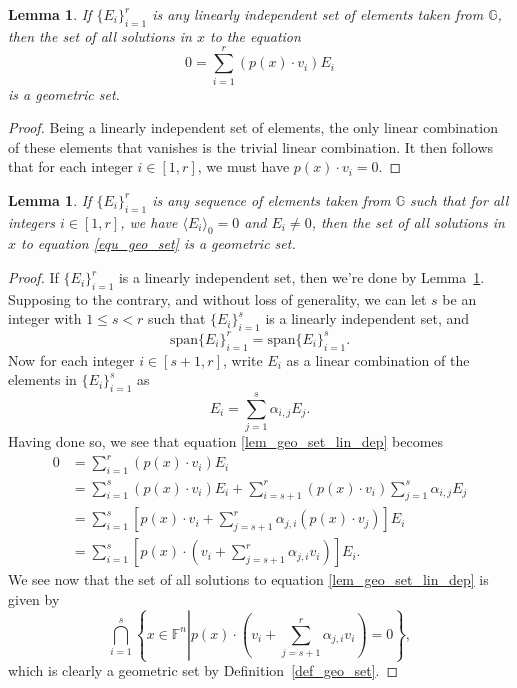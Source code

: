 \documentclass{birkjour}
\newtheorem{lem}[thm]{Lemma}
\theoremstyle{definition}
\theoremstyle{remark}
\numberwithin{equation}{section}
\newcommand{\F}{\mathbb{F}}
\newcommand{\G}{\mathbb{G}}
\begin{document}
\begin{lem}\label{lem_geo_set_lin_indep}
If $\{E_i\}_{i=1}^r$ is any linearly independent set of elements taken from $\G$, then the set of all
solutions in $x$ to the equation
\begin{equation}\label{equ_geo_set}
0 = \sum_{i=1}^r (p(x)\cdot v_i)E_i
\end{equation}
is a geometric set.
\end{lem}
\begin{proof}
Being a linearly independent set of elements, the only linear combination of these elements that vanishes is the trivial linear combination.
It then follows that for each integer $i\in[1,r]$, we must have $p(x)\cdot v_i=0$.
\end{proof}

\begin{lem}\label{lem_geo_set_lin_dep}
If $\{E_i\}_{i=1}^r$ is any sequence of elements taken from $\G$ such that for all integers $i\in[1,r]$, we have
$\langle E_i\rangle_0=0$ and $E_i\neq 0$, then the set of all solutions in $x$ to equation \eqref{equ_geo_set}
is a geometric set.
\end{lem}
\begin{proof}
If $\{E_i\}_{i=1}^r$ is a linearly independent set, then we're done by Lemma~\ref{lem_geo_set_lin_indep}.
Supposing to the contrary, and without loss of generality, we can let $s$ be an integer with $1\leq s<r$ such that
$\{E_i\}_{i=1}^s$ is a linearly independent set, and
\begin{equation*}
\mbox{span}\{E_i\}_{i=1}^r = \mbox{span}\{E_i\}_{i=1}^s.
\end{equation*}
Now for each integer $i\in[s+1,r]$, write $E_i$ as a linear combination of the elements in $\{E_i\}_{i=1}^s$ as
\begin{equation*}
E_i = \sum_{j=1}^s\alpha_{i,j} E_j.
\end{equation*}
Having done so, we see that equation \eqref{lem_geo_set_lin_dep} becomes
\begin{align*}
0 &= \sum_{i=1}^r(p(x)\cdot v_i)E_i \\
 &= \sum_{i=1}^s(p(x)\cdot v_i)E_i + \sum_{i=s+1}^r(p(x)\cdot v_i)\sum_{j=1}^s\alpha_{i,j}E_j \\
 &= \sum_{i=1}^s\left[p(x)\cdot v_i+\sum_{j=s+1}^r\alpha_{j,i}(p(x)\cdot v_j)\right]E_i \\
 &= \sum_{i=1}^s\left[p(x)\cdot\left(v_i+\sum_{j=s+1}^r\alpha_{j,i}v_i\right)\right]E_i.
\end{align*}
We see now that the set of all solutions to equation \eqref{lem_geo_set_lin_dep} is given by
\begin{equation*}
\bigcap_{i=1}^s\left\{x\in\F^n\left|p(x)\cdot\left(v_i+\sum_{j=s+1}^r\alpha_{j,i}v_i\right)=0\right.\right\},
\end{equation*}
which is clearly a geometric set by Definition~\ref{def_geo_set}.
\end{proof}
\end{document}
